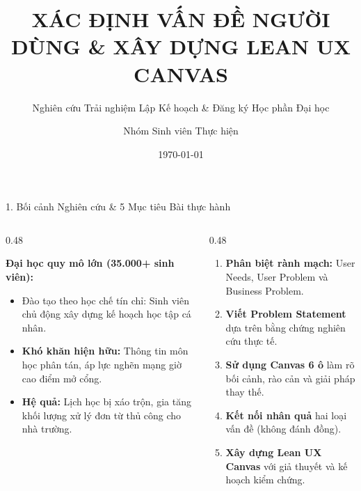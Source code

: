 \documentclass[aspectratio=169, 10pt]{beamer}
\title[IT3120 - User Problem \& Lean UX Canvas]{XÁC ĐỊNH VẤN ĐỀ NGƯỜI DÙNG \& XÂY DỰNG LEAN UX CANVAS}
\subtitle{Nghiên cứu Trải nghiệm Lập Kế hoạch \& Đăng ký Học phần Đại học}
\author[Nhóm Sinh viên]{Nhóm Sinh viên Thực hiện}
\institute[SOICT - HUST]{
    Trường Công nghệ Thông tin \& Truyền thông (SOICT)\\
    Đại học Bách khoa Hà Nội
}
\date{\today}
\begin{document}
\begin{frame}
    \titlepage
\end{frame}

\begin{frame}{1. Bối cảnh Nghiên cứu \& 5 Mục tiêu Bài thực hành}
    \begin{columns}[T]
        \begin{column}{0.48\textwidth}
            \begin{tcolorbox}[colback=CardBg, colframe=ThemeNavy, title=Bối cảnh Nghiên cứu]
                \small
                \textbf{Đại học quy mô lớn (35.000+ sinh viên):}
                \begin{itemize}
                    \item Đào tạo theo học chế tín chỉ: Sinh viên chủ động xây dựng kế hoạch học tập cá nhân.
                    \item \textbf{Khó khăn hiện hữu:} Thông tin môn học phân tán, áp lực nghẽn mạng giờ cao điểm mở cổng.
                    \item \textbf{Hệ quả:} Lịch học bị xáo trộn, gia tăng khối lượng xử lý đơn từ thủ công cho nhà trường.
                \end{itemize}
            \end{tcolorbox}
        \end{column}
        
        \begin{column}{0.48\textwidth}
            \begin{tcolorbox}[colback=CardBg, colframe=SoftTeal, title=5 Mục tiêu Cốt lõi]
                \small
                \begin{enumerate}
                    \item \textbf{Phân biệt rành mạch:} User Needs, User Problem và Business Problem.
                    \item \textbf{Viết Problem Statement} dựa trên bằng chứng nghiên cứu thực tế.
                    \item \textbf{Sử dụng Canvas 6 ô} làm rõ bối cảnh, rào cản và giải pháp thay thế.
                    \item \textbf{Kết nối nhân quả} hai loại vấn đề (không đánh đồng).
                    \item \textbf{Xây dựng Lean UX Canvas} với giả thuyết và kế hoạch kiểm chứng.
                \end{enumerate}
            \end{tcolorbox}
        \end{column}
    \end{columns}
\end{frame}
\end{document}
